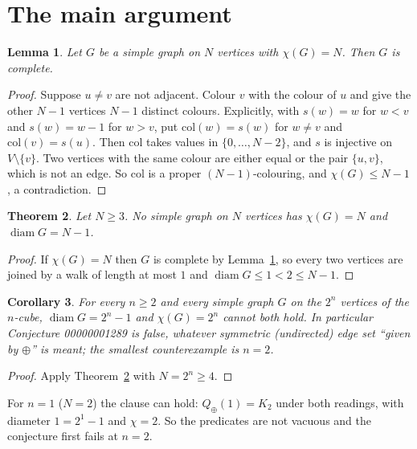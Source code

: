 \documentclass[11pt]{article}
\newtheorem{theorem}{Theorem}
\newtheorem{lemma}[theorem]{Lemma}
\newtheorem{corollary}[theorem]{Corollary}
\theoremstyle{definition}
\theoremstyle{remark}
\begin{document}
\section{The main argument}
\begin{lemma}\label{lem:complete}
Let $G$ be a simple graph on $N$ vertices with $\chi(G)=N$. Then $G$ is
complete.
\end{lemma}
\begin{proof}
Suppose $u\ne v$ are not adjacent. Colour $v$ with the colour of $u$ and give
the other $N-1$ vertices $N-1$ distinct colours. Explicitly, with
$s(w)=w$ for $w<v$ and $s(w)=w-1$ for $w>v$, put $\mathrm{col}(w)=s(w)$ for
$w\ne v$ and $\mathrm{col}(v)=s(u)$. Then $\mathrm{col}$ takes values in
$\{0,\dots,N-2\}$, and $s$ is injective on $V\setminus\{v\}$. Two vertices with
the same colour are either equal or the pair $\{u,v\}$, which is not an edge.
So $\mathrm{col}$ is a proper $(N-1)$-colouring, and $\chi(G)\le N-1$, a
contradiction.
\end{proof}

\begin{theorem}\label{thm:main}
Let $N\ge3$. No simple graph on $N$ vertices has $\chi(G)=N$ and
$\operatorname{diam}G=N-1$.
\end{theorem}
\begin{proof}
If $\chi(G)=N$ then $G$ is complete by Lemma~\ref{lem:complete}, so every two
vertices are joined by a walk of length at most $1$ and
$\operatorname{diam}G\le1<2\le N-1$.
\end{proof}

\begin{corollary}\label{cor:main}
For every $n\ge2$ and every simple graph $G$ on the $2^n$ vertices of the
$n$-cube, $\operatorname{diam}G=2^n-1$ and $\chi(G)=2^n$ cannot both hold. In
particular Conjecture 00000001289 is false, whatever symmetric (undirected) edge set
``given by $\oplus$'' is meant; the smallest counterexample is $n=2$.
\end{corollary}
\begin{proof}
Apply Theorem~\ref{thm:main} with $N=2^n\ge4$.
\end{proof}

For $n=1$ ($N=2$) the clause can hold: $Q_\oplus(1)=K_2$ under both readings,
with diameter $1=2^1-1$ and $\chi=2$. So the predicates are not vacuous and the
conjecture first fails at $n=2$.
\end{document}

